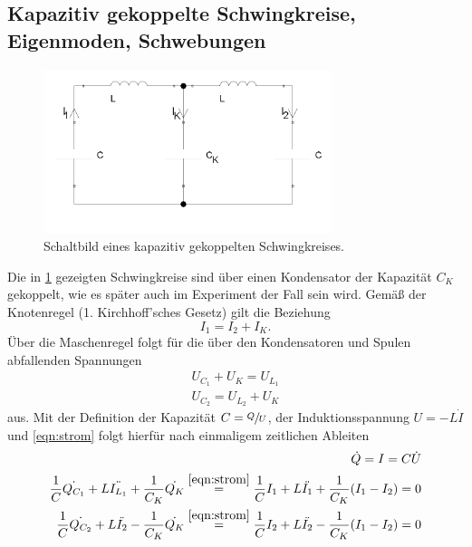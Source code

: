 \subsection{Kapazitiv gekoppelte Schwingkreise, Eigenmoden, Schwebungen}
\begin{figure}
    \centering
    \includegraphics[width=0.75\textwidth]{plots/allg_gekopp_schwingkreis.png}
    \caption{Schaltbild eines kapazitiv gekoppelten Schwingkreises.}
    \label{fig:kap_gekopp}
\end{figure}
Die in \ref{fig:kap_gekopp} gezeigten Schwingkreise sind über einen Kondensator der Kapazität $C_K$ gekoppelt, wie es 
später auch im Experiment der Fall sein wird. 
Gemäß der Knotenregel (1. Kirchhoff'sches Gesetz) gilt die Beziehung
\begin{equation}
    I_1 = I_2 + I_K .
    \label{eqn:strom}
\end{equation}
Über die Maschenregel folgt für die über den Kondensatoren und Spulen abfallenden Spannungen 
\begin{align} %
    U_{C_1} + U_K = U_{L_1} 
    \label{eqn:masche1} \\
    U_{C_2} = U_{L_2} + U_K  
    \label{eqn:masche2} 
\end{align}
aus.
Mit der Definition der Kapazität ${C=\sfrac{Q}{U}}$, der Induktionsspannung ${U=- L \dot{I}}$ und \eqref{eqn:strom} folgt 
hierfür nach einmaligem zeitlichen Ableiten 
\begin{align}
    \dot{Q} = I = C \dot{U} \\
    \frac{1}{C} \dot{Q_{C_1}} + L \ddot{I_{L_1}} + \frac{1}{C_K} \dot{Q_{K}} \stackrel{\eqref{eqn:strom}}{=} 
    \frac{1}{C} I_1 + L \ddot{I_1} + \frac{1}{C_K} (I_1 - I_2) = 0 \label{eqn:dgl1} \\
    \frac{1}{C} \dot{Q_{C_2}} + L \ddot{I_2} - \frac{1}{C_K} \dot{Q_{K}} \stackrel{\eqref{eqn:strom}}{=}
    \frac{1}{C} I_2 + L \ddot{I_2} - \frac{1}{C_K} (I_1 - I_2) = 0 \label{eqn:dgl2}
\end{align}
